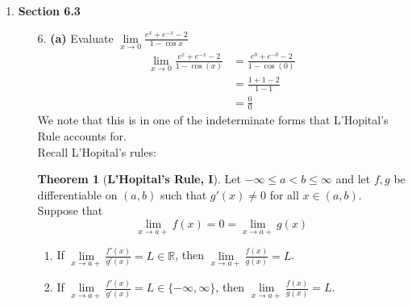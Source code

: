 \documentclass[12pt,letterpaper]{article}
\newcommand{\R}{\mathbb{R}}
\theoremstyle{case}
\theoremstyle{definition}
\newtheorem{theorem*}{Theorem}
\begin{document}
\begin{enumerate}
\begin{enumerate}
\begin{proof}
				So $f(x)=x^{\frac{1}{x}} \leq e^\frac{1}{x}\ \forall\ x \in (0,\infty)$. Thus
				\begin{align*}
					\frac{ln(x)}{x} &\leq \frac{1}{e} \\
					\ln(x) &\leq \frac{x}{e} \\
					&(x \leq e^\frac{x}{e})^e \\
					x^e &\leq e^x\ \forall\ x >0
				\end{align*}
			\end{proof}
		\end{enumerate}
	\textbf{Section 6.3 - L'Hôpital's Rule}
		\item \textbf{Section 6.3}
		\begin{enumerate}
			\item[6.] \textbf{(a)} Evaluate $\lim\limits_{x \to 0} \frac{e^x+e^{-x}-2}{1-\cos x}$\\
			
			\begin{align*}
				\lim\limits_{x \to 0} \frac{e^x+e^{-x}-2}{1-\cos (x)} &= \frac{e^0+e^{-0}-2}{1-\cos(0)} \\
				&= \frac{1+1-2}{1-1} \\
				&= \frac{0}{0}
			\end{align*}
			We note that this is in one of the indeterminate forms that L'Hopital's Rule accounts for.\\
			
			Recall L'Hopital's rules:
			\begin{theorem*}[\textbf{L'Hopital's Rule, I}]
				Let $-\infty \leq a < b \leq \infty$ and let $f,g$ be differentiable on $(a,b)$ such that $g'(x) \neq 0$ for all $x \in (a,b)$. Suppose that
				\[\lim\limits_{x\to a+} f(x) = 0 = \lim\limits_{x\to a+} g(x)\]
				
				\begin{enumerate}
					\item If $\lim\limits_{x\to a+} \frac{f'(x)}{g'(x)}=L \in \R$, then $\lim\limits_{x\to a+} \frac{f(x)}{g(x)}=L$.
					
					\item If $\lim\limits_{x\to a+} \frac{f'(x)}{g'(x)}=L \in \{-\infty, \infty\}$, then $\lim\limits_{x\to a+} \frac{f(x)}{g(x)}=L$.
				\end{enumerate}
			\end{theorem*}
			

\end{enumerate}
\end{enumerate}
\end{document}
